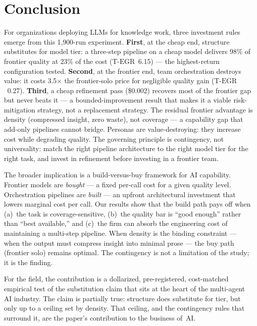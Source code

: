 \documentclass[12pt,a4paper]{article}
\newcommand{\TEGR}{\ensuremath{\text{T-EGR}}}
\begin{document}
\section{Conclusion}\label{sec:conclusion}

For organizations deploying LLMs for knowledge work, three investment rules
emerge from this 1{,}900-run experiment. \textbf{First}, at the cheap end,
structure substitutes for model tier: a three-step pipeline on a cheap model
delivers 98\% of frontier quality at 23\% of the cost ($\TEGR$~6.15) --- the
highest-return configuration tested. \textbf{Second}, at the frontier end, team
orchestration destroys value: it costs 3.5$\times$ the frontier-solo price for
negligible quality gain ($\TEGR$~0.27). \textbf{Third}, a cheap refinement pass
(\$0.002) recovers most of the frontier gap but never beats it --- a
bounded-improvement result that makes it a viable risk-mitigation strategy, not
a replacement strategy. The residual frontier advantage is density (compressed
insight, zero waste), not coverage --- a capability gap that add-only pipelines
cannot bridge. Personas are value-destroying: they increase cost while degrading
quality. The governing principle is contingency, not universality: match the
right pipeline architecture to the right model tier for the right task, and
invest in refinement before investing in a frontier team.

The broader implication is a build-versus-buy framework for AI capability.
Frontier models are \emph{bought} --- a fixed per-call cost for a given quality
level. Orchestration pipelines are \emph{built} --- an upfront architectural
investment that lowers marginal cost per call. Our results show that the build
path pays off when (a)~the task is coverage-sensitive, (b)~the quality bar is
``good enough'' rather than ``best available,'' and (c)~the firm can absorb the
engineering cost of maintaining a multi-step pipeline. When density is the
binding constraint --- when the output must compress insight into minimal prose
--- the buy path (frontier solo) remains optimal. The contingency is not a
limitation of the study; it is the finding.

For the field, the contribution is a dollarized, pre-registered, cost-matched
empirical test of the substitution claim that sits at the heart of the
multi-agent AI industry. The claim is partially true: structure does substitute
for tier, but only up to a ceiling set by density. That ceiling, and the
contingency rules that surround it, are the paper's contribution to the business
of~AI.
\end{document}
